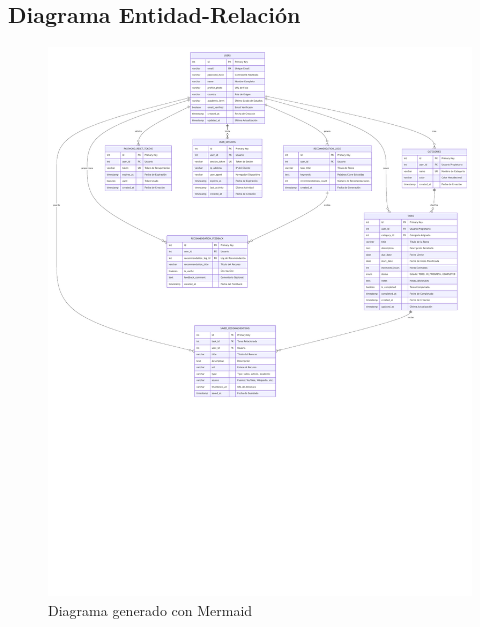 \documentclass{pretexto/report}
\begin{document}
\subsection{Diagrama Entidad-Relación}
\begin{figure}[H]
    \centering
    \includegraphics[width=\linewidth]{pdfs/relacional.pdf}
    \caption{Diagrama generado con Mermaid}
\end{figure}
\end{document}
